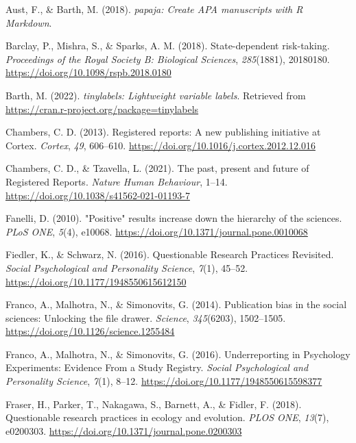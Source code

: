 \documentclass[british,,man,mask,floatsintext]{apa6}
\begin{document}
\leavevmode\hypertarget{ref-R-papaja}{}%
Aust, F., \& Barth, M. (2018). \emph{papaja: Create APA manuscripts with R Markdown}.

\leavevmode\hypertarget{ref-Barclay2018}{}%
Barclay, P., Mishra, S., \& Sparks, A. M. (2018). State-dependent risk-taking. \emph{Proceedings of the Royal Society B: Biological Sciences}, \emph{285}(1881), 20180180. \url{https://doi.org/10.1098/rspb.2018.0180}

\leavevmode\hypertarget{ref-R-tinylabels}{}%
Barth, M. (2022). \emph{tinylabels: Lightweight variable labels}. Retrieved from \url{https://cran.r-project.org/package=tinylabels}

\leavevmode\hypertarget{ref-Chambers2013}{}%
Chambers, C. D. (2013). Registered reports: A new publishing initiative at Cortex. \emph{Cortex}, \emph{49}, 606--610. \url{https://doi.org/10.1016/j.cortex.2012.12.016}

\leavevmode\hypertarget{ref-Chambers2021}{}%
Chambers, C. D., \& Tzavella, L. (2021). The past, present and future of Registered Reports. \emph{Nature Human Behaviour}, 1--14. \url{https://doi.org/10.1038/s41562-021-01193-7}

\leavevmode\hypertarget{ref-Fanelli2010}{}%
Fanelli, D. (2010). "Positive" results increase down the hierarchy of the sciences. \emph{PLoS ONE}, \emph{5}(4), e10068. \url{https://doi.org/10.1371/journal.pone.0010068}

\leavevmode\hypertarget{ref-Fiedler2016}{}%
Fiedler, K., \& Schwarz, N. (2016). Questionable Research Practices Revisited. \emph{Social Psychological and Personality Science}, \emph{7}(1), 45--52. \url{https://doi.org/10.1177/1948550615612150}

\leavevmode\hypertarget{ref-Franco2014}{}%
Franco, A., Malhotra, N., \& Simonovits, G. (2014). Publication bias in the social sciences: Unlocking the file drawer. \emph{Science}, \emph{345}(6203), 1502--1505. \url{https://doi.org/10.1126/science.1255484}

\leavevmode\hypertarget{ref-Franco2016}{}%
Franco, A., Malhotra, N., \& Simonovits, G. (2016). Underreporting in Psychology Experiments: Evidence From a Study Registry. \emph{Social Psychological and Personality Science}, \emph{7}(1), 8--12. \url{https://doi.org/10.1177/1948550615598377}

\leavevmode\hypertarget{ref-Fraser2018}{}%
Fraser, H., Parker, T., Nakagawa, S., Barnett, A., \& Fidler, F. (2018). Questionable research practices in ecology and evolution. \emph{PLOS ONE}, \emph{13}(7), e0200303. \url{https://doi.org/10.1371/journal.pone.0200303}
\end{document}
